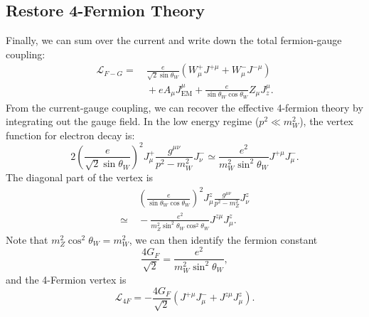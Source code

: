 \documentclass[aps,rmp,twocolumn,superscriptaddress,nofootinbib]{revtex4-2}
\begin{document}
\subsection{Restore 4-Fermion Theory}
Finally, we can sum over the current and write down the total fermion-gauge coupling:
\begin{equation}
\begin{aligned}
	\mathcal L_{F-G} =&\ \frac{e}{\sqrt{2}\sin{\theta_W}} \left(W^{+}_\mu J^{+\mu} + W^{-}_\mu J^{-\mu} \right) \\
	&\ + e A_\mu J^{\mu}_{\mathrm{EM}} + \frac{e}{\sin{\theta_W}\cos{\theta_W}} Z_\mu J^\mu_{z}.
\end{aligned}
\end{equation}
From the current-gauge coupling, we can recover the effective 4-fermion theory by integrating out the gauge field.
In the low energy regime ($p^2 \ll m_W^2$), the vertex function for electron decay is:
\begin{equation*}
	2\left(\frac{e}{\sqrt{2}\sin{\theta_W}} \right)^2 J^+_\mu \frac{g^{\mu\nu}}{p^2-m_W^2} J^-_\nu 
	\simeq \frac{e^2}{m_W^2 \sin^2{\theta_W}} J^{+\mu} J^-_\mu.
\end{equation*}
The diagonal part of the vertex is
\begin{equation*}
\begin{aligned}
	&\ \left(\frac{e}{\sin{\theta_W}\cos{\theta_W}} \right)^2 J^z_\mu \frac{g^{\mu\nu}}{p^2-m_Z^2} J^z_\nu \\
	\simeq &\ -\frac{e^2}{m_Z^2 \sin^2{\theta_W}\cos^2{\theta_W}} J^{z\mu} J^z_\mu.
\end{aligned}
\end{equation*}
Note that $m_Z^2\cos^2{\theta_W} = m_W^2$, we can then identify the fermion constant
\begin{equation}
	\frac{4G_F}{\sqrt 2} = \frac{e^2}{m_W^2 \sin^2{\theta_W}},
\end{equation}
and the 4-Fermion vertex is
\begin{equation}
	\mathcal L_{4F} = -\frac{4G_F}{\sqrt 2} \left(J^{+\mu} J_\mu^- + J^{z\mu} J_\mu^z \right).
\end{equation}
\end{document}
